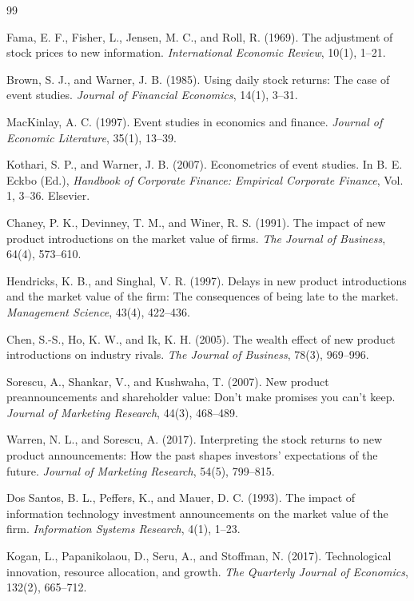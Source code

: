\documentclass[11pt,fontset=fandol,a4paper]{ctexart}
\begin{document}
\begin{thebibliography}{99}

Fama, E. F., Fisher, L., Jensen, M. C., and Roll, R. (1969).
The adjustment of stock prices to new information.
\textit{International Economic Review}, 10(1), 1--21.

Brown, S. J., and Warner, J. B. (1985).
Using daily stock returns: The case of event studies.
\textit{Journal of Financial Economics}, 14(1), 3--31.

MacKinlay, A. C. (1997).
Event studies in economics and finance.
\textit{Journal of Economic Literature}, 35(1), 13--39.

Kothari, S. P., and Warner, J. B. (2007).
Econometrics of event studies.
In B. E. Eckbo (Ed.), \textit{Handbook of Corporate Finance: Empirical Corporate Finance}, Vol. 1, 3--36.
Elsevier.

Chaney, P. K., Devinney, T. M., and Winer, R. S. (1991).
The impact of new product introductions on the market value of firms.
\textit{The Journal of Business}, 64(4), 573--610.

Hendricks, K. B., and Singhal, V. R. (1997).
Delays in new product introductions and the market value of the firm: The consequences of being late to the market.
\textit{Management Science}, 43(4), 422--436.

Chen, S.-S., Ho, K. W., and Ik, K. H. (2005).
The wealth effect of new product introductions on industry rivals.
\textit{The Journal of Business}, 78(3), 969--996.

Sorescu, A., Shankar, V., and Kushwaha, T. (2007).
New product preannouncements and shareholder value: Don't make promises you can't keep.
\textit{Journal of Marketing Research}, 44(3), 468--489.

Warren, N. L., and Sorescu, A. (2017).
Interpreting the stock returns to new product announcements: How the past shapes investors' expectations of the future.
\textit{Journal of Marketing Research}, 54(5), 799--815.

Dos Santos, B. L., Peffers, K., and Mauer, D. C. (1993).
The impact of information technology investment announcements on the market value of the firm.
\textit{Information Systems Research}, 4(1), 1--23.

Kogan, L., Papanikolaou, D., Seru, A., and Stoffman, N. (2017).
Technological innovation, resource allocation, and growth.
\textit{The Quarterly Journal of Economics}, 132(2), 665--712.


\end{thebibliography}
\end{document}
